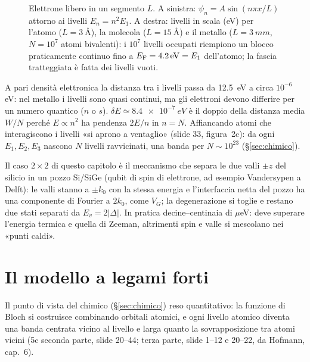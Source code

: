 \documentclass[11pt,a4paper]{article}
\begin{document}
\begin{figure}[tbp]
\centering
{}
\caption{Elettrone libero in un segmento $L$. A sinistra: $\psi_n=A\sin(n\pi x/L)$ attorno ai livelli $E_n=n^2E_1$. A destra: livelli in scala (eV) per l'atomo ($L=\SI{3}{\angstrom}$), la molecola ($L=\SI{15}{\angstrom}$) e il metallo
($L=\SI{3}{mm}$, $N=10^7$ atomi bivalenti): i $10^7$ livelli occupati riempiono un blocco praticamente continuo fino a $E_{\mathrm F}=\SI{4,2}{eV}=E_1$ dell'atomo; la fascia tratteggiata è fatta dei livelli vuoti.}\label{fig:qfscatola}
\end{figure}

\begin{risultato}
A pari densità elettronica la distanza tra i livelli passa da \SI{12,5}{eV} a circa $10^{-6}$ eV: nel metallo i livelli sono quasi continui, ma gli elettroni devono differire per un numero quantico ($n$ o $s$). $\delta E\simeq\SI{8,4e-7}{eV}$
è il doppio della distanza media $W/N$ perché $E\propto n^2$ ha pendenza $2E/n$ in $n=N$. Affiancando atomi che interagiscono i livelli «si aprono a ventaglio» (slide 33, figura~2c): da ogni $E_1,E_2,E_3$ nascono $N$ livelli
ravvicinati, una banda per $N\sim10^{23}$ (§\ref{sec:chimico}).
\end{risultato}

\begin{infobox}
Il caso $2\times2$ di questo capitolo è il meccanismo che separa le due valli $\pm z$ del silicio in un pozzo Si/SiGe (qubit di spin di elettrone, ad esempio Vandersypen a Delft): le valli stanno a $\pm k_0$ con la stessa energia e
l'interfaccia netta del pozzo ha una componente di Fourier a $2k_0$, come $V_G$; la degenerazione si toglie e restano due stati separati da $E_v=2|\Delta|$. In pratica decine--centinaia di $\mu$eV: deve superare l'energia termica e
quella di Zeeman, altrimenti spin e valle si mescolano nei «punti caldi».
\end{infobox}

\section{Il modello a legami forti}\label{sec:tb}
Il punto di vista del chimico (§\ref{sec:chimico}) reso quantitativo: la funzione di Bloch si costruisce combinando orbitali atomici, e ogni livello
atomico diventa una banda centrata vicino al livello e larga quanto la sovrapposizione tra atomi vicini (5c seconda parte, slide 20--44; terza
parte, slide 1--12 e 20--22, da Hofmann, cap.~6).
\end{document}
